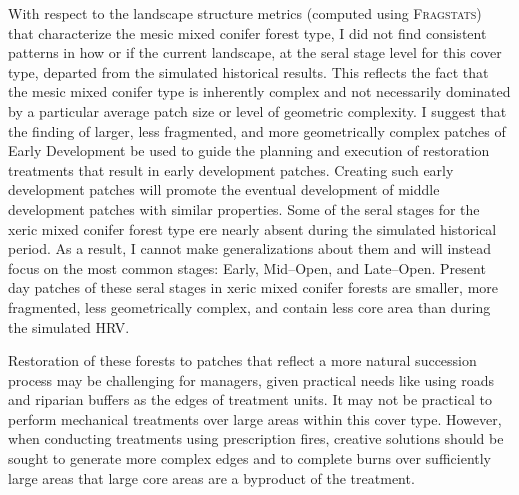 With respect to the landscape structure metrics (computed using \textsc{Fragstats}) that characterize the mesic mixed conifer forest type, I did not find consistent patterns in how or if the current landscape, at the seral stage level for this cover type, departed from the simulated historical results. This reflects the fact that the mesic mixed conifer type is inherently complex and not necessarily dominated by a particular average patch size or level of geometric complexity. I suggest that the finding of larger, less fragmented, and more geometrically complex patches of Early Development be used to guide the planning and execution of restoration treatments that result in early development patches. Creating such early development patches will promote the eventual development of middle development patches with similar properties. Some of the seral stages for the xeric mixed conifer forest type ere nearly absent during the simulated historical period. As a result, I cannot make generalizations about them and will instead focus on the most common stages: Early, Mid--Open, and Late--Open. Present day patches of these seral stages in xeric mixed conifer forests are smaller, more fragmented, less geometrically complex, and contain less core area than during the simulated HRV. 

Restoration of these forests to patches that reflect a more natural succession process may be challenging for managers, given practical needs like using roads and riparian buffers as the edges of treatment units. It may not be practical to perform mechanical treatments over large areas within this cover type. However, when conducting treatments using prescription fires, creative solutions should be sought to generate more complex edges and to complete burns over sufficiently large areas that large core areas are a byproduct of the treatment.











